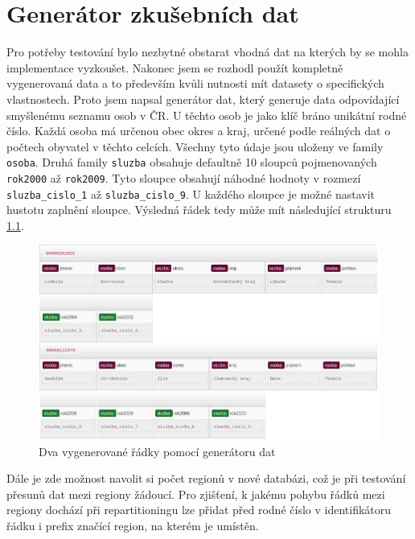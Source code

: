 \documentclass[thesis=M,czech]{FITthesis}[2012/06/26]
\begin{document}
\begin{conclusion}
\end{conclusion}




\appendix

\chapter{Generátor zkušebních dat}\label{ch:generator}
Pro potřeby testování bylo nezbytné obstarat vhodná dat na kterých by se mohla implementace vyzkoušet. Nakonec jsem se rozhodl použít kompletně vygenerovaná data a to především kvůli nutnosti mít datasety o specifických vlastnostech. Proto jsem napsal generátor dat, který generuje data odpovídající smyšlenému seznamu osob v ČR. U těchto osob je jako klíč bráno unikátní rodné číslo. Každá osoba má určenou obec okres a kraj, určené podle reálných dat o počtech obyvatel v těchto celcích. Všechny tyto údaje jsou uloženy ve family \texttt{osoba}. Druhá family \texttt{sluzba} obsahuje defaultně 10 sloupců pojmenovaných \texttt{rok2000} až \texttt{rok2009}. Tyto sloupce obsahují náhodné hodnoty v rozmezí \texttt{sluzba\_cislo\_1} až \texttt{sluzba\_cislo\_9}. U každého sloupce je možné nastavit hustotu zaplnění sloupce. Výsledná řádek tedy může mít následující strukturu \ref{fig:hue}.
\begin{figure}[h]\centering
	\includegraphics[width=1\textwidth, angle=0]{files/hue}
	\caption[Dva vygenerované řádky pomocí generátoru dat]
	{Dva vygenerované řádky pomocí generátoru dat}\label{fig:hue}
\end{figure} 

Dále je zde možnost navolit si počet regionů v nové databázi, což je při testování přesunů dat mezi regiony žádoucí. Pro zjišťení, k jakému pohybu řádků mezi regiony dochází při repartitioningu lze přidat před rodné číslo v identifikátoru řádku i prefix značící region, na kterém je umístěn. 
\end{document}
